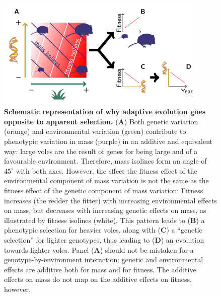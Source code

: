 \begin{figure}[h]
\includegraphics[width=0.9\textwidth]{FiguresStasis/Fig3}
\caption{\footnotesize \textbf{Schematic representation of why adaptive evolution goes opposite to apparent selection.} 
(\textbf{A}) Both genetic variation (orange) and environmental variation (green) contribute to phenotypic variation in mass (purple) in an additive and equivalent way: large voles are the result of genes for being large and of a favourable environment. Therefore, mass isolines form an angle of $45^\circ$ with both axes. However, the effect the fitness effect of the environmental component of mass variation is not the same as the fitness effect of the genetic component of mass variation: Fitness increases (the redder the fitter) with increasing environmental effects on mass, but decreases with increasing genetic effects on mass, as illustrated by fitness isolines (white). This pattern leads to (\textbf{B}) a phenotypic selection for heavier voles, along with (\textbf{C}) a ``genetic selection'' for lighter genotypes, thus leading to (\textbf{D}) an evolution towards lighter voles. Panel (\textbf{A}) should not be mistaken for a genotype-by-environment interaction: genetic and environmental effects are additive both for mass and for fitness. The additive effects on mass do not map on the additive effects on fitness, however.}
\label{fig:HypA}
\end{figure}

